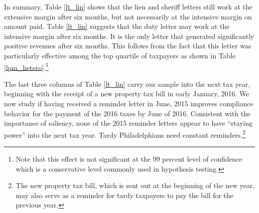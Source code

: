 \documentclass[12pt]{article}
\begin{document}
In summary, Table \ref{lt_lin} shows that the lien and sheriff letters
still work at the extensive margin after six months, but not
necessarily at the intensive margin on amount paid.  Table
\ref{lt_lin} suggests that the duty letter may work at the intensive
margin after six months. It is the only letter that generated
significantly positive revenues after six months. This follows from
the fact that this letter was particularly effective among the top
quartile of taxpayers as shown in Table
\ref{lpm_hetero}.\footnote{Note that this effect is not significant at
  the 99 percent level of confidence which is a conservative level
  commonly used in hypothesis testing.}

The last three columns of Table \ref{lt_lin} carry our sample into the
next tax year, beginning with the receipt of a new property tax bill
in early January, 2016. We now study if having received a reminder
letter in June, 2015 improves compliance behavior for the payment of
the 2016 taxes by June of 2016.  Consistent with the importance of
saliency, none of the 2015 reminder letters appear to have ``staying
power'' into the next tax year.  Tardy Philadelphians need constant
reminders.\footnote{The new property tax bill, which is sent out at
  the beginning of the new year, may also serve as a reminder for
  tardy taxpayers to pay the bill for the previous year.}
\end{document}
